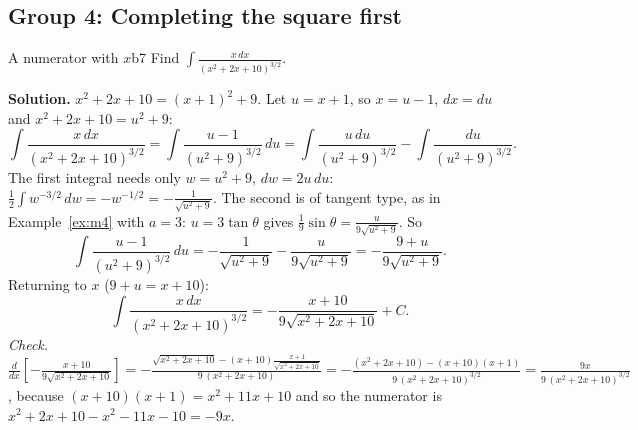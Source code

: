 \documentclass[11pt]{article}
\begin{document}
\subsection*{Group 4: Completing the square first}

\begin{exmp}{A numerator with $x$}{b7}
Find $\int\frac{x\,dx}{(x^2+2x+10)^{3/2}}$.

\textbf{Solution.} $x^2+2x+10=(x+1)^2+9$. Let $u=x+1$, so $x=u-1$, $dx=du$ and $x^2+2x+10=u^2+9$:
\[\int\frac{x\,dx}{(x^2+2x+10)^{3/2}}=\int\frac{u-1}{(u^2+9)^{3/2}}\,du=\int\frac{u\,du}{(u^2+9)^{3/2}}-\int\frac{du}{(u^2+9)^{3/2}} .\]
The first integral needs only $w=u^2+9$, $dw=2u\,du$: $\frac12\int w^{-3/2}\,dw=-w^{-1/2}=-\frac1{\sqrt{u^2+9}}$. The second is of tangent type, as in Example~\ref{ex:m4} with $a=3$: $u=3\tan\theta$ gives $\frac19\sin\theta=\frac u{9\sqrt{u^2+9}}$. So
\[\int\frac{u-1}{(u^2+9)^{3/2}}\,du=-\frac1{\sqrt{u^2+9}}-\frac u{9\sqrt{u^2+9}}=-\frac{9+u}{9\sqrt{u^2+9}} .\]
Returning to $x$ ($9+u=x+10$):
\[\int\frac{x\,dx}{(x^2+2x+10)^{3/2}}=-\frac{x+10}{9\sqrt{x^2+2x+10}}+C .\]
\emph{Check.} $\frac{d}{dx}\left[-\frac{x+10}{9\sqrt{x^2+2x+10}}\right]=-\frac{\sqrt{x^2+2x+10}-(x+10)\frac{x+1}{\sqrt{x^2+2x+10}}}{9\,(x^2+2x+10)}=-\frac{(x^2+2x+10)-(x+10)(x+1)}{9\,(x^2+2x+10)^{3/2}}=\frac{9x}{9\,(x^2+2x+10)^{3/2}}$, because $(x+10)(x+1)=x^2+11x+10$ and so the numerator is $x^2+2x+10-x^2-11x-10=-9x$.
\end{exmp}
\end{document}
